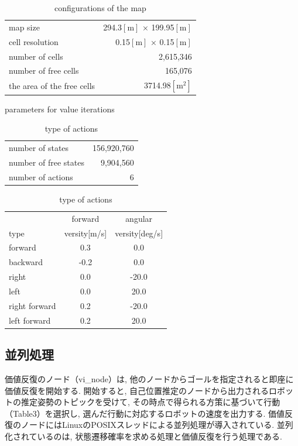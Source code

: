 \documentclass{jarticle}
\begin{document}
\begin{table}[hbtp]
  \caption{conﬁgurations of the map}
  \centering
  \begin{tabular}{l|r}
    \hline
    map size & 294.3$\mathrm{[m]}$ × 199.95$\mathrm{[m]}$\\
    cell resolution &  0.15$\mathrm{[m]}$ × 0.15$\mathrm{[m]}$ \\
		number of cells & 2,615,346\\
    number of free cells & 165,076\\
		the area of the free cells & 3714.98$\mathrm{[m^2]}$\\
    \hline
  \end{tabular}
\end{table}

\begin{table}[hbtp]
	\caption{parameters for value iterations}
  \centering
  \begin{tabular}{l|r}
    \hline
    number of states & 156,920,760\\
    number of free states &  9,904,560\\
		number of actions & 6\\
    \hline
  \end{tabular}
	\caption{type of actions}
	\centering
	\begin{tabular}{l|cc}
 		\hline
		& forward & angular \\
 		type & versity[m/s] & versity[deg/s] \\
 		\hline \hline
 		forward & 0.3 & 0.0 \\
 		backward & -0.2 & 0.0 \\
 		right & 0.0 & -20.0 \\
 		left & 0.0 & 20.0 \\
 		right forward & 0.2 & -20.0 \\
 		left forward & 0.2 & 20.0 \\
	 \hline
	\end{tabular}
\end{table}

\subsection{並列処理}
価値反復のノード（vi\_node）は, 他のノードからゴールを指定されると即座に価値反復を開始する.
開始すると, 自己位置推定のノードから出力されるロボットの推定姿勢のトピックを受けて, 
その時点で得られる方策に基づいて行動（Table3）を選択し, 選んだ行動に対応するロボットの速度を出力する.
価値反復のノードにはLinuxのPOSIXスレッドによる並列処理が導入されている. 並列化されているのは, 状態遷移確率を求める処理と価値反復を行う処理である.
\end{document}
